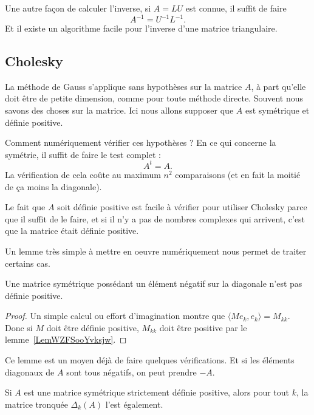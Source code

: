Une autre façon de calculer l'inverse, si \( A=LU\) est connue, il suffit de faire
\begin{equation}
	A^{-1}=U^{-1}L^{-1}.
\end{equation}
Et il existe un algorithme facile pour l'inverse d'une matrice triangulaire.

\subsection{Cholesky}

La méthode de Gauss s'applique sans hypothèses sur la matrice \( A\), à part qu'elle doit être de petite dimension, comme pour toute méthode directe. Souvent nous savons des choses sur la matrice. Ici nous allons supposer que \( A\) est symétrique et définie positive.

Comment numériquement vérifier ces hypothèses ? En ce qui concerne la symétrie, il suffit de faire le test complet :
\begin{equation}
	A^t=A.
\end{equation}
La vérification de cela coûte au maximum \( n^2\) comparaisons (et en fait la moitié de ça moins la diagonale).

Le fait que \( A\) soit définie positive est facile à vérifier pour utiliser Cholesky parce que il suffit de le faire, et si il n'y a pas de nombres complexes qui arrivent, c'est que la matrice était définie positive.

Un lemme très simple à mettre en oeuvre numériquement nous permet de traiter certains cas.
\begin{lemma}
	Une matrice symétrique possédant un élément négatif sur la diagonale n'est pas définie positive.
\end{lemma}

\begin{proof}
	Un simple calcul ou effort d'imagination montre que \( \langle Me_k, e_k\rangle =M_{kk}\). Donc si \( M\) doit être définie positive, \( M_{kk}\) doit être positive par le lemme~\ref{LemWZFSooYvksjw}.
\end{proof}
Ce lemme est un moyen déjà de faire quelques vérifications. Et si les éléments diagonaux de \( A\) sont tous négatifs, on peut prendre \( -A\).

\begin{lemma}       \label{LEMooVEIYooZbShQb}
	Si \( A\) est une matrice symétrique strictement définie positive, alors pour tout \( k\), la matrice tronquée \( \Delta_k(A)\) l'est également.
\end{lemma}

